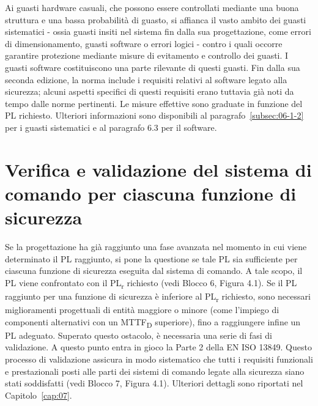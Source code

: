 Ai guasti hardware casuali, che possono essere controllati mediante una buona struttura e una bassa probabilità di guasto, si affianca il vasto ambito dei guasti sistematici - ossia guasti insiti nel sistema fin dalla sua progettazione, come errori di dimensionamento, guasti software o errori logici - contro i quali occorre garantire protezione mediante misure di evitamento e controllo dei guasti. I guasti software costituiscono una parte rilevante di questi guasti. Fin dalla sua seconda edizione, la norma include i requisiti relativi al software legato alla sicurezza; alcuni aspetti specifici di questi requisiti erano tuttavia già noti da tempo dalle norme pertinenti. Le misure effettive sono graduate in funzione del PL richiesto. Ulteriori informazioni sono disponibili al paragrafo~\ref{subsec:06-1-2} per i guasti sistematici e al paragrafo 6.3 per il software.

\section{Verifica e validazione del sistema di comando per ciascuna funzione di sicurezza}
\label{sec:04-3}
Se la progettazione ha già raggiunto una fase avanzata nel momento in cui viene determinato il PL raggiunto, si pone la questione se tale PL sia sufficiente per ciascuna funzione di sicurezza eseguita dal sistema di comando. A tale scopo, il PL viene confrontato con il PL\textsubscript{\small r} richiesto (vedi Blocco 6, Figura 4.1). Se il PL raggiunto per una funzione di sicurezza è inferiore al PL\textsubscript{\small r} richiesto, sono necessari miglioramenti progettuali di entità maggiore o minore (come l'impiego di componenti alternativi con un MTTF\textsubscript{D} superiore), fino a raggiungere infine un PL adeguato. Superato questo ostacolo, è necessaria una serie di fasi di validazione. A questo punto entra in gioco la Parte 2 della EN ISO 13849. Questo processo di validazione assicura in modo sistematico che tutti i requisiti funzionali e prestazionali posti alle parti dei sistemi di comando legate alla sicurezza siano stati soddisfatti (vedi Blocco 7, Figura 4.1). Ulteriori dettagli sono riportati nel Capitolo~\ref{cap:07}.

